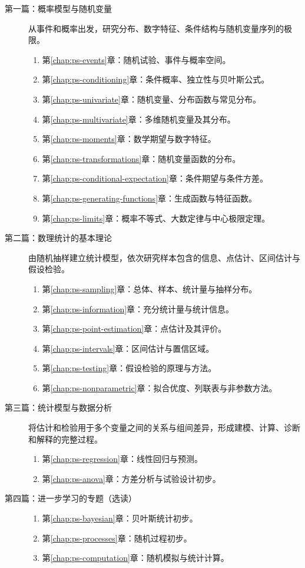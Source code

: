 \documentclass[UTF8,12pt,a4paper,fontset=fandol]{ctexbook}
\begin{document}
\begin{description}
  \item[第一篇：概率模型与随机变量]
  从事件和概率出发，研究分布、数字特征、条件结构与随机变量序列的极限。
  \begin{enumerate}
    \item 第\ref{chap:ps-events}章：随机试验、事件与概率空间。
    \item 第\ref{chap:ps-conditioning}章：条件概率、独立性与贝叶斯公式。
    \item 第\ref{chap:ps-univariate}章：随机变量、分布函数与常见分布。
    \item 第\ref{chap:ps-multivariate}章：多维随机变量及其分布。
    \item 第\ref{chap:ps-moments}章：数学期望与数字特征。
    \item 第\ref{chap:ps-transformations}章：随机变量函数的分布。
    \item 第\ref{chap:ps-conditional-expectation}章：条件期望与条件方差。
    \item 第\ref{chap:ps-generating-functions}章：生成函数与特征函数。
    \item 第\ref{chap:ps-limits}章：概率不等式、大数定律与中心极限定理。
  \end{enumerate}
  \item[第二篇：数理统计的基本理论]
  由随机抽样建立统计模型，依次研究样本包含的信息、点估计、区间估计与假设检验。
  \begin{enumerate}
    \item 第\ref{chap:ps-sampling}章：总体、样本、统计量与抽样分布。
    \item 第\ref{chap:ps-information}章：充分统计量与统计信息。
    \item 第\ref{chap:ps-point-estimation}章：点估计及其评价。
    \item 第\ref{chap:ps-intervals}章：区间估计与置信区域。
    \item 第\ref{chap:ps-testing}章：假设检验的原理与方法。
    \item 第\ref{chap:ps-nonparametric}章：拟合优度、列联表与非参数方法。
  \end{enumerate}
  \item[第三篇：统计模型与数据分析]
  将估计和检验用于多个变量之间的关系与组间差异，形成建模、计算、诊断和解释的完整过程。
  \begin{enumerate}
    \item 第\ref{chap:ps-regression}章：线性回归与预测。
    \item 第\ref{chap:ps-anova}章：方差分析与试验设计初步。
  \end{enumerate}
  \item[第四篇：进一步学习的专题（选读）]
  \begin{enumerate}
    \item 第\ref{chap:ps-bayesian}章：贝叶斯统计初步。
    \item 第\ref{chap:ps-processes}章：随机过程初步。
    \item 第\ref{chap:ps-computation}章：随机模拟与统计计算。
  \end{enumerate}
\end{description}
\end{document}
